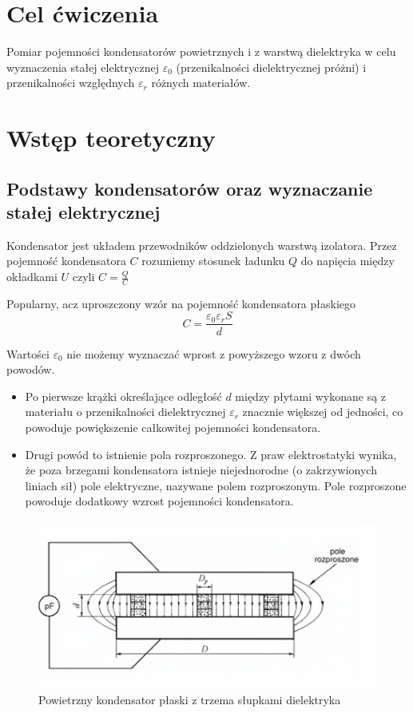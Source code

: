 \documentclass{fizykalab}
\begin{document}
\maketitle

\section{Cel ćwiczenia}
Pomiar pojemności kondensatorów powietrznych i z warstwą
dielektryka w celu wyznaczenia stałej elektrycznej 
$\varepsilon_0$ (przenikalności dielektrycznej próżni)
i przenikalności względnych $\varepsilon_r$ różnych materiałów.

\section{Wstęp teoretyczny}
\subsection{Podstawy kondensatorów oraz wyznaczanie stałej elektrycznej}
Kondensator jest układem przewodników oddzielonych warstwą izolatora. 
Przez pojemność kondensatora $C$ 
rozumiemy stosunek ładunku $Q$ do napięcia między okładkami $U$
czyli $C = \frac{Q}{C}$

Popularny, acz uproszczony wzór na pojemność kondensatora płaskiego
\begin{equation}
    \label{eq:C_basic}
    C = \frac{\varepsilon_0 \varepsilon_r S}{d}
\end{equation}

Wartości $\varepsilon_0$ nie możemy wyznaczać wprost z powyższego wzoru
z dwóch powodów.
\begin{itemize}
    \item Po pierwsze krążki określające odległość $d$ między płytami wykonane
    są z materiału o przenikalności dielektrycznej $\varepsilon_r$
    znacznie większej od jedności, co powoduje powiększenie całkowitej
    pojemności kondensatora.
    \item Drugi powód to istnienie pola rozproszonego.
    Z praw elektrostatyki wynika, że poza brzegami
    kondensatora istnieje niejednorodne (o zakrzywionych liniach sił)
    pole elektryczne, nazywane
    polem rozproszonym.
    Pole rozproszone powoduje dodatkowy wzrost pojemności
    kondensatora.
\end{itemize}

\begin{figure}[H]
    \centering
    \includegraphics[width=0.5\linewidth]{download.png}
    \caption{Powietrzny kondensator płaski z trzema słupkami dielektryka}
    \label{fig:kondensator}
\end{figure}
\end{document}
